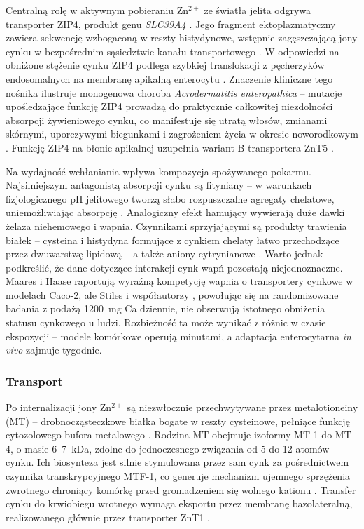 \documentclass[12pt,a4paper]{article}
\begin{document}
Centralną rolę w aktywnym pobieraniu Zn\(^{2+}\) ze światła jelita odgrywa transporter ZIP4, produkt genu \textit{SLC39A4} \cite{kambe2015, maares2020, stiles2024}. Jego fragment ektoplazmatyczny zawiera sekwencję wzbogaconą w reszty histydynowe, wstępnie zagęszczającą jony cynku w bezpośrednim sąsiedztwie kanału transportowego \cite{kambe2015}. W odpowiedzi na obniżone stężenie cynku ZIP4 podlega szybkiej translokacji z pęcherzyków endosomalnych na membranę apikalną enterocytu \cite{hara2017}. Znaczenie kliniczne tego nośnika ilustruje monogenowa choroba \textit{Acrodermatitis enteropathica} -- mutacje upośledzające funkcję ZIP4 prowadzą do praktycznie całkowitej niezdolności absorpcji żywieniowego cynku, co manifestuje się utratą włosów, zmianami skórnymi, uporczywymi biegunkami i zagrożeniem życia w okresie noworodkowym \cite{hara2017, stiles2024}. Funkcję ZIP4 na błonie apikalnej uzupełnia wariant B transportera ZnT5 \cite{maares2020}.

Na wydajność wchłaniania wpływa kompozycja spożywanego pokarmu. Najsilniejszym antagonistą absorpcji cynku są fityniany -- w warunkach fizjologicznego pH jelitowego tworzą słabo rozpuszczalne agregaty chelatowe, uniemożliwiając absorpcję \cite{maares2020}. Analogiczny efekt hamujący wywierają duże dawki żelaza niehemowego i wapnia. Czynnikami sprzyjającymi są produkty trawienia białek -- cysteina i histydyna formujące z cynkiem chelaty łatwo przechodzące przez dwuwarstwę lipidową -- a także aniony cytrynianowe \cite{maares2020, stiles2024}. Warto jednak podkreślić, że dane dotyczące interakcji cynk-wapń pozostają niejednoznaczne. Maares i Haase \cite{maares2020} raportują wyraźną kompetycję wapnia o transportery cynkowe w modelach Caco-2, ale Stiles i współautorzy \cite{stiles2024}, powołując się na randomizowane badania z podażą 1200~mg Ca dziennie, nie obserwują istotnego obniżenia statusu cynkowego u ludzi. Rozbieżność ta może wynikać z różnic w czasie ekspozycji -- modele komórkowe operują minutami, a adaptacja enterocytarna \textit{in vivo} zajmuje tygodnie.

\subsubsection*{Transport}

Po internalizacji jony Zn\(^{2+}\) są niezwłocznie przechwytywane przez metalotioneiny (MT) -- drobnocząsteczkowe białka bogate w reszty cysteinowe, pełniące funkcję cytozolowego bufora metalowego \cite{maares2020}. Rodzina MT obejmuje izoformy MT-1 do MT-4, o masie 6--7~kDa, zdolne do jednoczesnego związania od 5 do 12 atomów cynku. Ich biosynteza jest silnie stymulowana przez sam cynk za pośrednictwem czynnika transkrypcyjnego MTF-1, co generuje mechanizm ujemnego sprzężenia zwrotnego chroniący komórkę przed gromadzeniem się wolnego kationu \cite{hara2017, maares2020}. Transfer cynku do krwiobiegu wrotnego wymaga eksportu przez membranę bazolateralną, realizowanego głównie przez transporter ZnT1 \cite{kambe2015, maares2020}.
\end{document}
